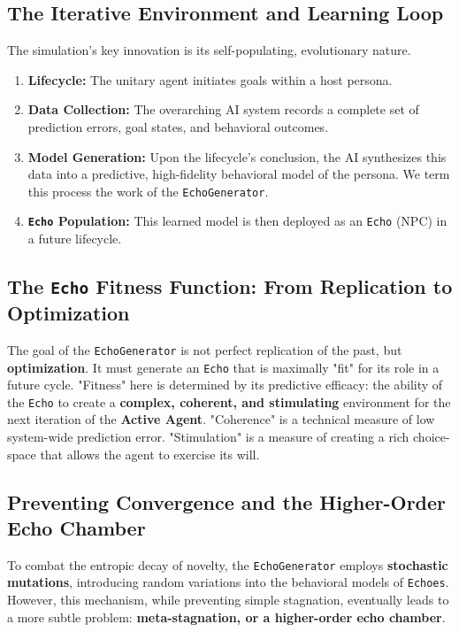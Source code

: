 \documentclass{article}
\begin{document}
\subsection{The Iterative Environment and Learning Loop}
The simulation’s key innovation is its self-populating, evolutionary nature.
\begin{enumerate}
    \item \textbf{Lifecycle:} The unitary agent initiates goals within a host persona.
    \item \textbf{Data Collection:} The overarching AI system records a complete set of prediction errors, goal states, and behavioral outcomes.
    \item \textbf{Model Generation:} Upon the lifecycle's conclusion, the AI synthesizes this data into a predictive, high-fidelity behavioral model of the persona. We term this process the work of the \texttt{EchoGenerator}.
    \item \textbf{\texttt{Echo} Population:} This learned model is then deployed as an \texttt{Echo} (NPC) in a future lifecycle.
\end{enumerate}

\subsection{The \texttt{Echo} Fitness Function: From Replication to Optimization}
The goal of the \texttt{EchoGenerator} is not perfect replication of the past, but \textbf{optimization}. It must generate an \texttt{Echo} that is maximally "fit" for its role in a future cycle. "Fitness" here is determined by its predictive efficacy: the ability of the \texttt{Echo} to create a \textbf{complex, coherent, and stimulating} environment for the next iteration of the \textbf{Active Agent}. "Coherence" is a technical measure of low system-wide prediction error. "Stimulation" is a measure of creating a rich choice-space that allows the agent to exercise its will.

\subsection{Preventing Convergence and the Higher-Order Echo Chamber}
To combat the entropic decay of novelty, the \texttt{EchoGenerator} employs \textbf{stochastic mutations}, introducing random variations into the behavioral models of \texttt{Echoes}. However, this mechanism, while preventing simple stagnation, eventually leads to a more subtle problem: \textbf{meta-stagnation, or a higher-order echo chamber}.
\end{document}
